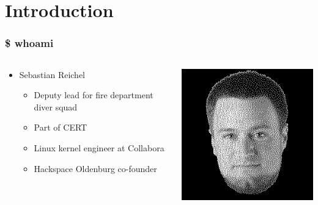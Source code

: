 \documentclass[aspectratio=169]{beamer}
\begin{document}
\section{Introduction}

\begin{frame}
	\frametitle{\$ whoami}

	\begin{columns}
		\begin{column}{0.7\textwidth}
			\begin{itemize}
				\item Sebastian Reichel
					\begin{itemize}
						\item Deputy lead for fire department diver squad
						\item Part of CERT
						\item Linux kernel engineer at Collabora
						\item Hackspace Oldenburg co-founder
					\end{itemize}
			\end{itemize}
		\end{column}
		\begin{column}{0.3\textwidth}
			\includegraphics[width=1.0\textwidth]{sre.dithered.png}
		\end{column}
	\end{columns}
\end{frame}
\end{document}
